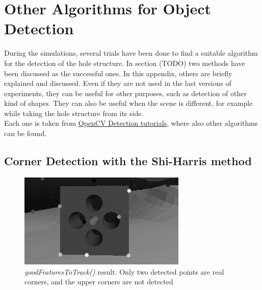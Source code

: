 

\chapter{Other Algorithms for Object Detection}
\label{chap:AppendixVision}
\ifpdf
    \graphicspath{{Vision/Figures/PNG/}{Vision/Figures/PDF/}{Vision/Figures/}}
\else
    \graphicspath{{Vision/Figures/EPS/}{Vision/Figures/}}
\fi

During the simulations, several trials have been done to find a suitable algorithm for the detection of the hole structure. In section (TODO) %
two methods have been discussed as the successful ones. In this appendix, others are briefly explained and discussed. Even if they are not used in the last versions of experiments, they can be useful for other purposes, such as detection of other kind of shapes. They can also be useful when the scene is different, for example while taking the hole structure from its side.\\
Each one is taken from \href{https://docs.opencv.org/3.4/d9/d97/tutorial_table_of_content_features2d.html}{OpenCV Detection tutorials}, where also other algorithms can be found.

\section{Corner Detection with the Shi-Harris method}

\begin{figure}[H]
	\centering
	\includegraphics[width=8.0cm]{goodFeatToTrack}
	\caption[Result of \textit{goodFeaturesToTrack()}]{\textit{goodFeaturesToTrack()} result. Only two detected points are real corners, and the upper corners are not detected} 
	\label{fig:goodFeatToTrack}
\end{figure}


